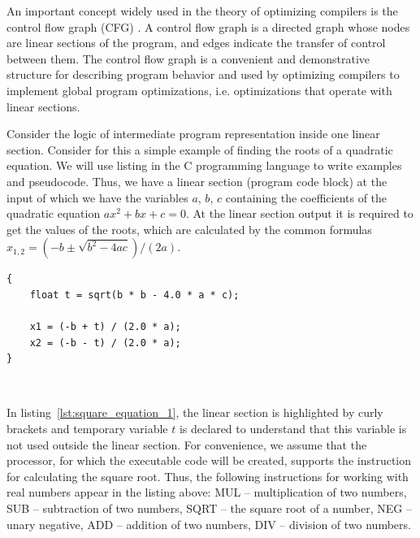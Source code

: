 \documentclass[
11pt,%
tightenlines,%
twoside,%
onecolumn,%
nofloats,%
nobibnotes,%
nofootinbib,%
superscriptaddress,%
noshowpacs,%
centertags]%
{revtex4}
\begin{document}
An important concept widely used in the theory of optimizing compilers is the control flow graph (CFG) \cite{Muchnick}.
A control flow graph is a directed graph whose nodes are linear sections of the program, and edges indicate the transfer of control between them.
The control flow graph is a convenient and demonstrative structure for describing program behavior and used by optimizing compilers to implement global program optimizations, i.e. optimizations that operate with linear sections.

Consider the logic of intermediate program representation inside one linear section.
Consider for this a simple example of finding the roots of a quadratic equation.
We will use listing in the C programming language to write examples and pseudocode.
Thus, we have a linear section (program code block) at the input of which we have the variables $a$, $b$, $c$ containing the coefficients of the quadratic equation $ax^2 + bx + c = 0$.
At the linear section output it is required to get the values of the roots, which are calculated by the common formulas $x_{1,2} = (-b \pm \sqrt{b^2 - 4ac})/(2a)$.

\begin{lstlisting}[caption={The code block for calculating the roots of quadratic equation.},label={lst:square_equation_1}]
{
    float t = sqrt(b * b - 4.0 * a * c);
    
    x1 = (-b + t) / (2.0 * a);
    x2 = (-b - t) / (2.0 * a);
}
\end{lstlisting}

\

In listing~\ref{lst:square_equation_1}, the linear section is highlighted by curly brackets and temporary variable $t$ is declared to understand that this variable is not used outside the linear section.
For convenience, we assume that the processor, for which the executable code will be created, supports the instruction for calculating the square root.
Thus, the following instructions for working with real numbers appear in the listing above: MUL -- multiplication of two numbers, SUB -- subtraction of two numbers, SQRT -- the square root of a number, NEG -- unary negative, ADD -- addition of two numbers, DIV -- division of two numbers.
\end{document}
